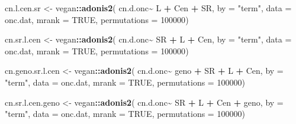 \documentclass[
]{article}
\newenvironment{Shaded}{\begin{snugshade}}{\end{snugshade}}
\newcommand{\AttributeTok}[1]{\textcolor[rgb]{0.13,0.29,0.53}{#1}}
\newcommand{\ConstantTok}[1]{\textcolor[rgb]{0.56,0.35,0.01}{#1}}
\newcommand{\DecValTok}[1]{\textcolor[rgb]{0.00,0.00,0.81}{#1}}
\newcommand{\FunctionTok}[1]{\textcolor[rgb]{0.13,0.29,0.53}{\textbf{#1}}}
\newcommand{\NormalTok}[1]{#1}
\newcommand{\OtherTok}[1]{\textcolor[rgb]{0.56,0.35,0.01}{#1}}
\newcommand{\SpecialCharTok}[1]{\textcolor[rgb]{0.81,0.36,0.00}{\textbf{#1}}}
\newcommand{\StringTok}[1]{\textcolor[rgb]{0.31,0.60,0.02}{#1}}
\begin{document}
\begin{Shaded}
\begin{Highlighting}[]
\NormalTok{cn.l.cen.sr  }\OtherTok{\textless{}{-}}\NormalTok{ vegan}\SpecialCharTok{::}\FunctionTok{adonis2}\NormalTok{(}
\NormalTok{                           cn.d.onc}\SpecialCharTok{\textasciitilde{}}\NormalTok{ L }\SpecialCharTok{+}\NormalTok{ Cen }\SpecialCharTok{+}\NormalTok{ SR,}
                           \AttributeTok{by =} \StringTok{"term"}\NormalTok{, }
                           \AttributeTok{data =}\NormalTok{ onc.dat, }
                           \AttributeTok{mrank =} \ConstantTok{TRUE}\NormalTok{,}
                           \AttributeTok{permutations =} \DecValTok{100000}\NormalTok{)}

\NormalTok{cn.sr.l.cen  }\OtherTok{\textless{}{-}}\NormalTok{ vegan}\SpecialCharTok{::}\FunctionTok{adonis2}\NormalTok{(}
\NormalTok{                           cn.d.onc}\SpecialCharTok{\textasciitilde{}}\NormalTok{ SR }\SpecialCharTok{+}\NormalTok{ L }\SpecialCharTok{+}\NormalTok{ Cen,}
                           \AttributeTok{by =} \StringTok{"term"}\NormalTok{, }
                           \AttributeTok{data =}\NormalTok{ onc.dat, }
                           \AttributeTok{mrank =} \ConstantTok{TRUE}\NormalTok{,}
                           \AttributeTok{permutations =} \DecValTok{100000}\NormalTok{)}


\NormalTok{cn.geno.sr.l.cen  }\OtherTok{\textless{}{-}}\NormalTok{ vegan}\SpecialCharTok{::}\FunctionTok{adonis2}\NormalTok{(}
\NormalTok{                                cn.d.onc}\SpecialCharTok{\textasciitilde{}}\NormalTok{ geno }\SpecialCharTok{+}\NormalTok{ SR }\SpecialCharTok{+}\NormalTok{ L }\SpecialCharTok{+}\NormalTok{ Cen,}
                                \AttributeTok{by =} \StringTok{"term"}\NormalTok{, }
                                \AttributeTok{data =}\NormalTok{ onc.dat, }
                                \AttributeTok{mrank =} \ConstantTok{TRUE}\NormalTok{,}
                                \AttributeTok{permutations =} \DecValTok{100000}\NormalTok{)}

\NormalTok{cn.sr.l.cen.geno  }\OtherTok{\textless{}{-}}\NormalTok{ vegan}\SpecialCharTok{::}\FunctionTok{adonis2}\NormalTok{(}
\NormalTok{                           cn.d.onc}\SpecialCharTok{\textasciitilde{}}\NormalTok{ SR }\SpecialCharTok{+}\NormalTok{ L }\SpecialCharTok{+}\NormalTok{ Cen }\SpecialCharTok{+}\NormalTok{ geno,}
                           \AttributeTok{by =} \StringTok{"term"}\NormalTok{, }
                           \AttributeTok{data =}\NormalTok{ onc.dat, }
                           \AttributeTok{mrank =} \ConstantTok{TRUE}\NormalTok{,}
                           \AttributeTok{permutations =} \DecValTok{100000}\NormalTok{)}
\end{Highlighting}
\end{Shaded}
\end{document}
